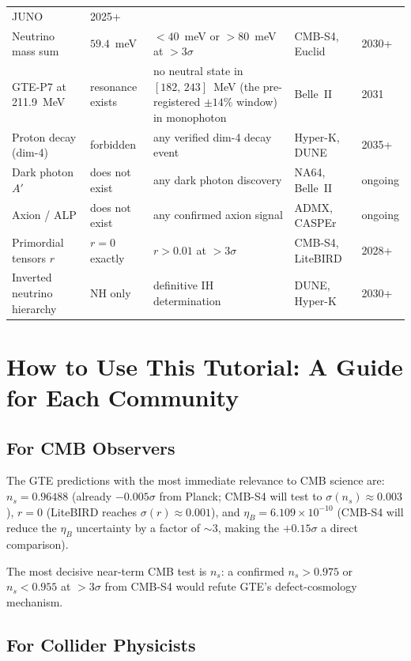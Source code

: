 \documentclass[11pt,a4paper]{article}
\begin{document}
\begin{longtable}[l]{@{}p{3.5cm}p{3.2cm}p{2.4cm}p{2.4cm}p{2.5cm}@{}}
  JUNO &
  2025+ \\[4pt]
Neutrino mass sum &
  $59.4$~meV &
  $<40$~meV or $>80$~meV at $>3\sigma$ &
  CMB-S4, Euclid &
  2030+ \\[4pt]
GTE-P7 at 211.9~MeV &
  resonance exists &
  no neutral state in $[182,\,243]$~MeV (the pre-registered $\pm14\%$ window) in monophoton &
  Belle~II &
  2031 \\[4pt]
Proton decay (dim-4) &
  forbidden &
  any verified dim-4 decay event &
  Hyper-K, DUNE &
  2035+ \\[4pt]
Dark photon $A'$ &
  does not exist &
  any dark photon discovery &
  NA64, Belle~II &
  ongoing \\[4pt]
Axion / ALP &
  does not exist &
  any confirmed axion signal &
  ADMX, CASPEr &
  ongoing \\[4pt]
Primordial tensors $r$ &
  $r = 0$ exactly &
  $r > 0.01$ at $>3\sigma$ &
  CMB-S4, LiteBIRD &
  2028+ \\[4pt]
Inverted neutrino hierarchy &
  NH only &
  definitive IH determination &
  DUNE, Hyper-K &
  2030+ \\
\end{longtable}

\section{How to Use This Tutorial: A Guide for Each Community}
\label{sec:communities}

\subsection{For CMB Observers}

The GTE predictions with the most immediate relevance to CMB science are:
$n_s = 0.96488$ (already $-0.005\sigma$ from Planck; CMB-S4 will test to
$\sigma(n_s) \approx 0.003$), $r = 0$ (LiteBIRD reaches $\sigma(r) \approx 0.001$),
and $\eta_B = 6.109 \times 10^{-10}$ (CMB-S4 will reduce the $\eta_B$ uncertainty
by a factor of $\sim 3$, making the $+0.15\sigma$ a direct comparison).

The most decisive near-term CMB test is $n_s$: a confirmed $n_s > 0.975$ or
$n_s < 0.955$ at $>3\sigma$ from CMB-S4 would refute GTE's defect-cosmology
mechanism.

\subsection{For Collider Physicists}
\end{document}

